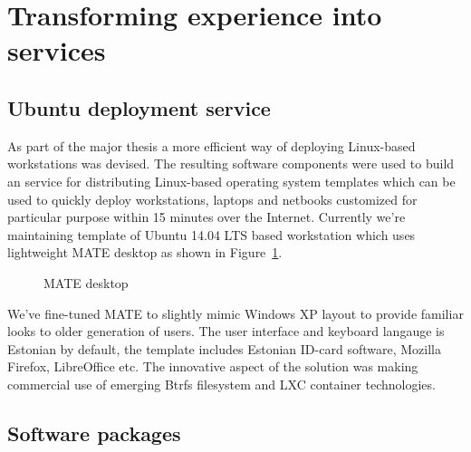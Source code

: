 \documentclass{article}
\begin{document}
\section{Transforming experience into services}

\subsection{Ubuntu deployment service}

As part of the major thesis a more efficient way of deploying Linux-based
workstations was devised.
The resulting software components were used to build an service for
distributing Linux-based operating system templates which can be used to
quickly deploy workstations, laptops and netbooks customized
for particular purpose within 15 minutes over the Internet.
Currently we're maintaining template of Ubuntu 14.04 LTS based
workstation which uses lightweight MATE desktop as
shown in Figure~\ref{fig:mate}.

\begin{figure}[!htb]
\centering
{}
\caption{MATE desktop}
\label{fig:mate}
\end{figure}

We've fine-tuned MATE to slightly mimic Windows XP layout to provide
familiar looks to older generation of users.
The user interface and keyboard langauge is Estonian by default,
the template includes
Estonian ID-card software,
Mozilla Firefox, LibreOffice etc.
The innovative aspect of the solution was making commercial use of
emerging Btrfs filesystem and LXC container technologies.

\subsection{Software packages}
\end{document}

